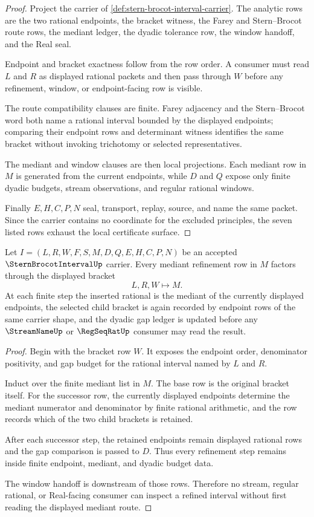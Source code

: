\begin{proof}
Project the carrier of \autoref{def:stern-brocot-interval-carrier}. The analytic rows are the two rational endpoints, the bracket witness, the Farey and Stern--Brocot route rows, the mediant ledger, the dyadic tolerance row, the window handoff, and the Real seal.

Endpoint and bracket exactness follow from the row order. A consumer must read $L$ and $R$ as displayed rational packets and then pass through $W$ before any refinement, window, or endpoint-facing row is visible.

The route compatibility clauses are finite. Farey adjacency and the Stern--Brocot word both name a rational interval bounded by the displayed endpoints; comparing their endpoint rows and determinant witness identifies the same bracket without invoking trichotomy or selected representatives.

The mediant and window clauses are then local projections. Each mediant row in $M$ is generated from the current endpoints, while $D$ and $Q$ expose only finite dyadic budgets, stream observations, and regular rational windows.

Finally $E,H,C,P,N$ seal, transport, replay, source, and name the same packet. Since the carrier contains no coordinate for the excluded principles, the seven listed rows exhaust the local certificate surface.
\end{proof}

\begin{theorem}
\label{thm:stern-brocot-interval-mediant-refinement}
Let $I=(L,R,W,F,S,M,D,Q,E,H,C,P,N)$ be an accepted $\SternBrocotIntervalUp$ carrier. Every mediant refinement row in $M$ factors through the displayed bracket
$$
L,R,W \longmapsto M .
$$
At each finite step the inserted rational is the mediant of the currently displayed endpoints, the selected child bracket is again recorded by endpoint rows of the same carrier shape, and the dyadic gap ledger is updated before any $\StreamNameUp$ or $\RegSeqRatUp$ consumer may read the result.
\end{theorem}
\begin{proof}
Begin with the bracket row $W$. It exposes the endpoint order, denominator positivity, and gap budget for the rational interval named by $L$ and $R$.

Induct over the finite mediant list in $M$. The base row is the original bracket itself. For the successor row, the currently displayed endpoints determine the mediant numerator and denominator by finite rational arithmetic, and the row records which of the two child brackets is retained.

After each successor step, the retained endpoints remain displayed rational rows and the gap comparison is passed to $D$. Thus every refinement step remains inside finite endpoint, mediant, and dyadic budget data.

The window handoff is downstream of those rows. Therefore no stream, regular rational, or Real-facing consumer can inspect a refined interval without first reading the displayed mediant route.
\end{proof}

